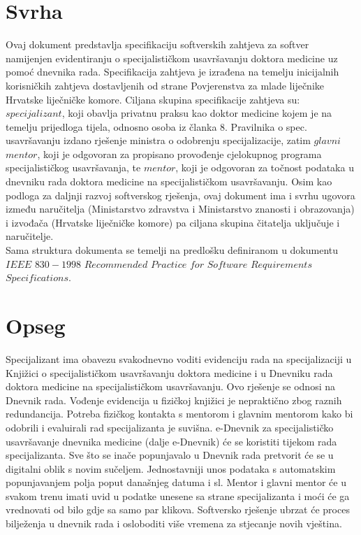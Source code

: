\documentclass{scrreprt}
\begin{document}
\section{Svrha}
Ovaj dokument predstavlja specifikaciju softverskih zahtjeva za softver namijenjen evidentiranju o specijalističkom usavršavanju doktora medicine uz pomoć dnevnika rada. Specifikacija zahtjeva je izrađena na temelju inicijalnih korisničkih zahtjeva dostavljenih od strane Povjerenstva za mlade liječnike Hrvatske liječničke komore. Ciljana skupina specifikacije zahtjeva su: $specijalizant$, koji obavlja privatnu praksu kao doktor medicine kojem je na temelju prijedloga tijela, odnosno osoba iz članka 8. Pravilnika o spec. usavršavanju izdano rješenje ministra o odobrenju specijalizacije, zatim $glavni$ $mentor$, koji je odgovoran za propisano provođenje cjelokupnog programa specijalističkog usavršavanja, te $mentor$, koji je odgovoran za točnost podataka u dnevniku rada doktora medicine na specijalističkom usavršavanju. Osim kao podloga za daljnji razvoj softverskog rješenja, ovaj dokument ima i svrhu ugovora između naručitelja (Ministarstvo zdravstva i Ministarstvo znanosti i obrazovanja) i izvođača (Hrvatske liječničke komore) pa ciljana skupina čitatelja uključuje i naručitelje.\\
Sama struktura dokumenta se temelji na predlošku definiranom u dokumentu $IEEE$ $830-1998$ $Recommended$ $Practice$ $for$ $Software$ $Requirements$ $Specifications$.

\section{Opseg}
Specijalizant ima obavezu svakodnevno voditi evidenciju rada na specijalizaciji u Knjižici o specijalističkom usavršavanju doktora medicine i u Dnevniku rada doktora medicine na specijalističkom usavršavanju. Ovo rješenje se odnosi na Dnevnik rada. Vođenje evidencija u fizičkoj knjižici je nepraktično zbog raznih redundancija. Potreba fizičkog kontakta s mentorom i glavnim mentorom kako bi odobrili i evaluirali rad specijalizanta je suvišna. e-Dnevnik za specijalističko usavršavanje dnevnika medicine (dalje e-Dnevnik) će se koristiti tijekom rada specijalizanta. Sve što se inače popunjavalo u Dnevnik rada pretvorit će se u digitalni oblik s novim sučeljem. Jednostavniji unos podataka s automatskim popunjavanjem polja poput današnjeg datuma i sl. Mentor i glavni mentor će u svakom trenu imati uvid u podatke unesene sa strane specijalizanta i moći će ga vrednovati od bilo gdje sa samo par klikova. Softversko rješenje ubrzat će proces bilježenja u dnevnik rada i osloboditi više vremena za stjecanje novih vještina.
\end{document}
